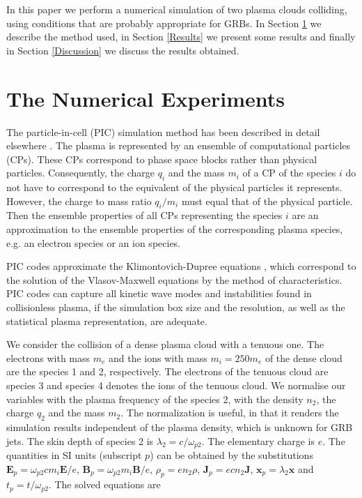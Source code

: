 \documentclass[structabstract]{aa}
\begin{document}
In this paper we perform a numerical simulation of two plasma clouds colliding, 
using conditions that are probably appropriate for GRBs. In Section \ref{Method} 
we describe the method used, in Section \ref{Results} we present some results and 
finally in Section \ref{Discussion} we discuss the results obtained.



\section{The Numerical Experiments}
\label{Method}

The particle-in-cell (PIC) simulation method has been described in detail 
elsewhere \citep{Dawson:1983dz}. The plasma is represented by an ensemble of 
computational particles (CPs). These CPs correspond to phase space blocks 
rather than physical particles. Consequently, the charge $q_i$ and the mass 
$m_i$ of a CP of the species $i$ do not have to correspond to the equivalent 
of the physical particles it represents. However, the charge to mass ratio 
$q_i / m_i$ must equal that of the physical particle. Then the ensemble 
properties of all CPs representing the species $i$ are an approximation to 
the ensemble properties of the corresponding plasma species, e.g. an electron 
species or an ion species. 

PIC codes approximate the Klimontovich-Dupree equations \citep{Dupree:1963la},
which correspond to the solution of the Vlasov-Maxwell equations by the method
of characteristics. PIC codes can capture all kinetic wave modes and 
instabilities found in collisionless plasma, if the simulation box size and 
the resolution, as well as the statistical plasma representation, are adequate.

We consider the collision of a dense plasma cloud with a tenuous one. The electrons with mass 
$m_e$ and the ions with mass $m_i = 250 m_e$ of the dense cloud are the species 1 and 2, 
respectively. The electrons of the tenuous cloud are species 3 and species 4 denotes the ions 
of the tenuous cloud. We normalise our variables with the plasma frequency of the species 2, 
with the density $n_2$, the charge $q_2$ and the mass $m_2$. The normalization is useful, in 
that it renders the simulation results independent of the plasma density, which is unknown 
for GRB jets. The skin depth of species 2 is $\lambda_2 = c / \omega_{p2}$. The elementary 
charge is $e$. The quantities in SI units (subscript $p$) can be obtained by the substitutions 
$\mathbf{E}_p = \omega_{p2} c m_i \mathbf{E} / e$, $\mathbf{B}_p = \omega_{p2} m_i \mathbf{B}/ e$, 
$\rho_p = e n_2 \rho$, $\mathbf{J}_p = e c n_2 \mathbf{J}$, $\mathbf{x}_p = \lambda_2 \mathbf{x}$ 
and $t_p = t / \omega_{p2}$. The solved equations are
\end{document}
